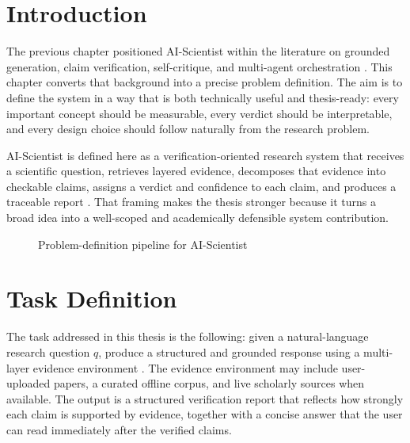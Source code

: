 \section{Introduction}

The previous chapter positioned AI-Scientist within the literature on grounded generation, claim verification, self-critique, and multi-agent orchestration \cite{lewis2020rag,thorne2018fever,shinn2023reflexion,wu2023autogen}. This chapter converts that background into a precise problem definition. The aim is to define the system in a way that is both technically useful and thesis-ready: every important concept should be measurable, every verdict should be interpretable, and every design choice should follow naturally from the research problem.

AI-Scientist is defined here as a verification-oriented research system that receives a scientific question, retrieves layered evidence, decomposes that evidence into checkable claims, assigns a verdict and confidence to each claim, and produces a traceable report \cite{petroni2020kilt,thakur2021beir,es2023ragas}. That framing makes the thesis stronger because it turns a broad idea into a well-scoped and academically defensible system contribution.

\begin{figure}[H]
\centering
{}
\caption{Problem-definition pipeline for AI-Scientist}
\label{fig:problem_definition_pipeline}
\end{figure}

\section{Task Definition}

The task addressed in this thesis is the following: given a natural-language research question \(q\), produce a structured and grounded response using a multi-layer evidence environment \cite{guu2020realm,karpukhin2020dpr,khattab2020colbert}. The evidence environment may include user-uploaded papers, a curated offline corpus, and live scholarly sources when available. The output is a structured verification report that reflects how strongly each claim is supported by evidence, together with a concise answer that the user can read immediately after the verified claims.

